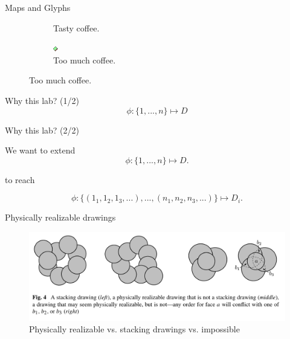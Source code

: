 \documentclass{beamer}
\begin{document}
\begin{frame}{Maps and Glyphs}
\begin{figure}[!b]
\begin{subfigure}[b]{0.45\linewidth}
      \caption{Tasty coffee.}
    \end{subfigure}
    \begin{subfigure}[b]{0.45\linewidth}
      \centering
      \includegraphics[width=0.5\linewidth]{assets/symbol_square}
      \caption{Too much coffee.}
    \end{subfigure}
  \end{figure}

\end{frame}

\begin{frame}{Why this lab? (1/2)}
$$
\phi: \{1,...,n\} \mapsto D
$$
\end{frame}

\begin{frame}{Why this lab? (2/2)}

  We want to extend
$$
\phi: \{1,...,n\} \mapsto D.
$$

to reach

$$
\phi: \{(1_1,1_2,1_3,...),...,(n_1, n_2, n_3,...)\} \mapsto D_i.
$$

\end{frame}

\begin{frame}{Physically realizable drawings}
  \begin{figure}[!b]
    \centering
      \includegraphics[width=0.9\linewidth]{assets/cabello_drawings.png}
      \caption{Physically realizable vs. stacking drawings vs. impossible}
  \end{figure}
\end{frame}
\end{document}
